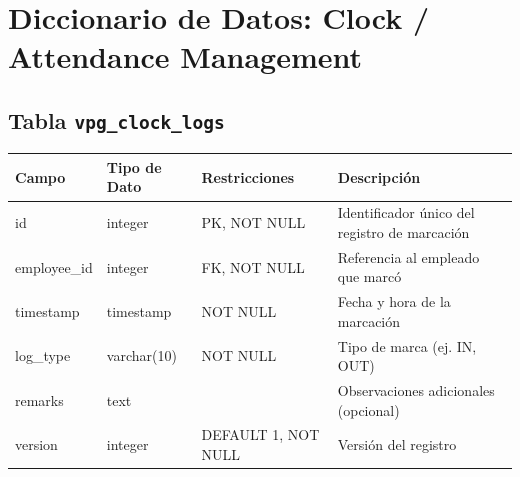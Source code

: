 \section{Diccionario de Datos: Clock / Attendance Management}
\begin{center}

	\subsection{Tabla \texttt{vpg\_clock\_logs}}
	\small
	\begin{tabular}{|l|l|l|p{6cm}|}
		\hline
		\textbf{Campo} & \textbf{Tipo de Dato} & \textbf{Restricciones} & \textbf{Descripción}                          \\
		\hline
		id             & integer               & PK, NOT NULL           & Identificador único del registro de marcación \\
		employee\_id   & integer               & FK, NOT NULL           & Referencia al empleado que marcó              \\
		timestamp      & timestamp             & NOT NULL               & Fecha y hora de la marcación                  \\
		log\_type      & varchar(10)           & NOT NULL               & Tipo de marca (ej. IN, OUT)                   \\
		remarks        & text                  &                        & Observaciones adicionales (opcional)          \\
		version        & integer               & DEFAULT 1, NOT NULL    & Versión del registro                          \\
		\hline
	\end{tabular}
	\normalsize
\end{center}
